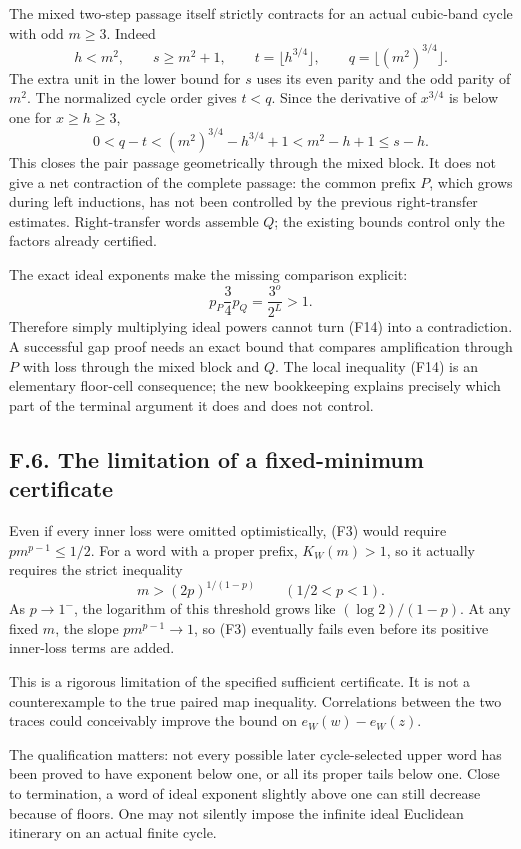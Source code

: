 \documentclass[12pt]{article}
\begin{document}
The mixed two-step passage itself strictly contracts for an actual
cubic-band cycle with odd \(m\ge3\). Indeed \[
h<m^2,\qquad s\ge m^2+1,\qquad
t=\lfloor h^{3/4}\rfloor,\qquad
q=\lfloor(m^2)^{3/4}\rfloor.
\] The extra unit in the lower bound for \(s\) uses its even parity and
the odd parity of \(m^2\). The normalized cycle order gives \(t<q\).
Since the derivative of \(x^{3/4}\) is below one for \(x\ge h\ge3\), \[
0<q-t
<(m^2)^{3/4}-h^{3/4}+1
<m^2-h+1\le s-h.
\tag{F14}
\] This closes the pair passage geometrically through the mixed block.
It does not give a net contraction of the complete passage: the common
prefix \(P\), which grows during left inductions, has not been
controlled by the previous right-transfer estimates. Right-transfer
words assemble \(Q\); the existing bounds control only the factors
already certified.

The exact ideal exponents make the missing comparison explicit: \[
p_P\frac34p_Q=\frac{3^o}{2^L}>1.
\tag{F15}
\] Therefore simply multiplying ideal powers cannot turn (F14) into a
contradiction. A successful gap proof needs an exact bound that compares
amplification through \(P\) with loss through the mixed block and \(Q\).
The local inequality (F14) is an elementary floor-cell consequence; the
new bookkeeping explains precisely which part of the terminal argument
it does and does not control.

\subsection{F.6. The limitation of a fixed-minimum
certificate}\label{f.6.-the-limitation-of-a-fixed-minimum-certificate}

Even if every inner loss were omitted optimistically, (F3) would require
\(p m^{p-1}\le1/2\). For a word with a proper prefix, \(K_W(m)>1\), so
it actually requires the strict inequality \[
m>(2p)^{1/(1-p)}\qquad (1/2<p<1).
\tag{F16}
\] As \(p\to1^-\), the logarithm of this threshold grows like
\((\log2)/(1-p)\). At any fixed \(m\), the slope \(p m^{p-1}\to1\), so
(F3) eventually fails even before its positive inner-loss terms are
added.

This is a rigorous limitation of the specified sufficient certificate.
It is not a counterexample to the true paired map inequality.
Correlations between the two traces could conceivably improve the bound
on \(e_W(w)-e_W(z)\).

The qualification matters: not every possible later cycle-selected upper
word has been proved to have exponent below one, or all its proper tails
below one. Close to termination, a word of ideal exponent slightly above
one can still decrease because of floors. One may not silently impose
the infinite ideal Euclidean itinerary on an actual finite cycle.
\end{document}
